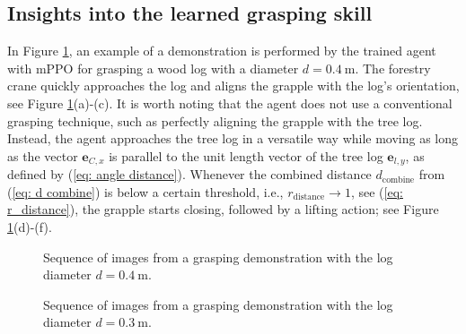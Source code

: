 \subsection{Insights into the learned grasping skill}
In Figure \ref{fig: grasping skill 1}, an example of a demonstration is performed by the trained agent with mPPO for grasping a wood log with a diameter $d=\SI{0.4}{\meter}$. The forestry crane quickly approaches the log and aligns the grapple with the log's orientation, see Figure \ref{fig: grasping skill 1}(a)-(c). 
It is worth noting that the agent does not use a conventional grasping technique, such as perfectly aligning the grapple with the tree log. Instead, the agent approaches the tree log in a versatile way while moving as long as the vector $\mathbf{e}_{C,x}$ is parallel to the unit length vector of the tree log $\mathbf{e}_{l,y}$, as defined by (\ref{eq: angle distance}). Whenever the combined distance $d_\mathrm{combine}$ from (\ref{eq: d combine}) is below a certain threshold, i.e., $r_\mathrm{distance} \rightarrow 1$, see (\ref{eq: r_distance}), the grapple starts closing, followed by a lifting action; see Figure \ref{fig: grasping skill 1}(d)-(f). 
\iffalse
    Note that not all demonstrations have shown the same behavior. For instance, to grasp a log with the diameter $d=\SI{0.3}{\meter}$ while approaching and aligning to the wood log pose, the agent slightly lifts the grapple, see Figure \ref{fig: grasping skill 2}(c), to perfectly grasp the wood log without rolling it, see Figure \ref{fig: grasping skill 2}(d). These behaviors are obtained thanks to the agent's ability to explore using the modified PPO algorithm during the training process. 
\fi    
\begin{figure}
\centering
\def\svgwidth{0.8\columnwidth}

\vspace{0.2cm}
\caption{Sequence of images from a grasping demonstration with the log diameter $d = \SI{0.4}{\meter}$. }
\label{fig: grasping skill 1}
\end{figure}
\iffalse
    \begin{figure*}
    \centering
    \caption{Sequence of images from a grasping demonstration with the log diameter $d = \SI{0.3}{\meter}$. }
    \label{fig: grasping skill 2}
    \end{figure*}
